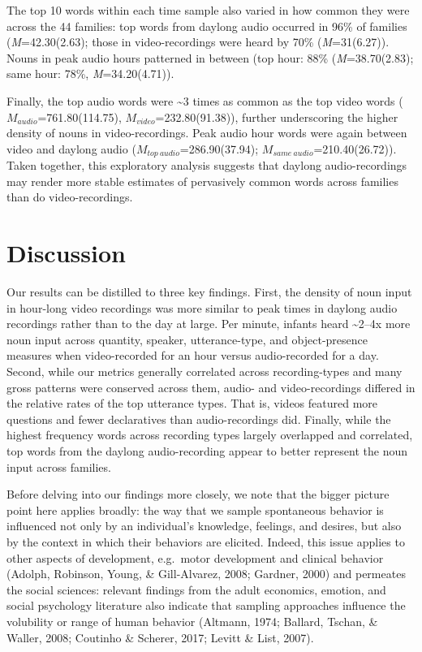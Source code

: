 \documentclass[man]{apa6}
\theoremstyle{definition}
\theoremstyle{definition}
\theoremstyle{definition}
\theoremstyle{remark}
\begin{document}
The top 10 words within each time sample also varied in how common they
were across the 44 families: top words from daylong audio occurred in
96\% of families (\emph{M}=42.30(2.63); those in video-recordings were
heard by 70\% (\emph{M}=31(6.27)). Nouns in peak audio hours patterned
in between (top hour: 88\% (\emph{M}=38.70(2.83); same hour: 78\%,
\emph{M}=34.20(4.71)).

Finally, the top audio words were \textasciitilde{}3 times as common as
the top video words (\(M_{audio}\)=761.80(114.75),
\(M_{video}\)=232.80(91.38)), further underscoring the higher density of
nouns in video-recordings. Peak audio hour words were again between
video and daylong audio (\(M_{top\ audio}\)=286.90(37.94);
\(M_{same\ audio}\)=210.40(26.72)). Taken together, this exploratory
analysis suggests that daylong audio-recordings may render more stable
estimates of pervasively common words across families than do
video-recordings.

\section{Discussion}\label{discussion}

Our results can be distilled to three key findings. First, the density
of noun input in hour-long video recordings was more similar to peak
times in daylong audio recordings rather than to the day at large. Per
minute, infants heard \textasciitilde{}2--4x more noun input across
quantity, speaker, utterance-type, and object-presence measures when
video-recorded for an hour versus audio-recorded for a day. Second,
while our metrics generally correlated across recording-types and many
gross patterns were conserved across them, audio- and video-recordings
differed in the relative rates of the top utterance types. That is,
videos featured more questions and fewer declaratives than
audio-recordings did. Finally, while the highest frequency words across
recording types largely overlapped and correlated, top words from the
daylong audio-recording appear to better represent the noun input across
families.

Before delving into our findings more closely, we note that the bigger
picture point here applies broadly: the way that we sample spontaneous
behavior is influenced not only by an individual's knowledge, feelings,
and desires, but also by the context in which their behaviors are
elicited. Indeed, this issue applies to other aspects of development,
e.g.~motor development and clinical behavior (Adolph, Robinson, Young,
\& Gill-Alvarez, 2008; Gardner, 2000) and permeates the social sciences:
relevant findings from the adult economics, emotion, and social
psychology literature also indicate that sampling approaches influence
the volubility or range of human behavior (Altmann, 1974; Ballard,
Tschan, \& Waller, 2008; Coutinho \& Scherer, 2017; Levitt \& List,
2007).
\end{document}
